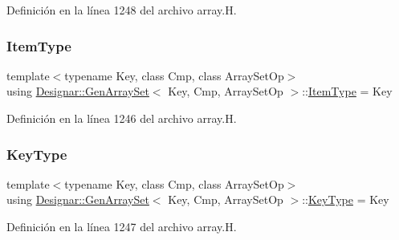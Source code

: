 Definición en la línea 1248 del archivo array.\+H.

\mbox{\label{class_designar_1_1_gen_array_set_a4db3cb71a2b2f88fee2a5f66688e5230}} 
\subsubsection{\texorpdfstring{Item\+Type}{ItemType}}
{\footnotesize\ttfamily template$<$typename Key, class Cmp, class Array\+Set\+Op$>$ \\
using \hyperlink{class_designar_1_1_gen_array_set}{Designar\+::\+Gen\+Array\+Set}$<$ Key, Cmp, Array\+Set\+Op $>$\+::\hyperlink{class_designar_1_1_gen_array_set_a4db3cb71a2b2f88fee2a5f66688e5230}{Item\+Type} =  Key}



Definición en la línea 1246 del archivo array.\+H.

\mbox{\label{class_designar_1_1_gen_array_set_a21195191743cf71430c939225a2c8d60}} 
\subsubsection{\texorpdfstring{Key\+Type}{KeyType}}
{\footnotesize\ttfamily template$<$typename Key, class Cmp, class Array\+Set\+Op$>$ \\
using \hyperlink{class_designar_1_1_gen_array_set}{Designar\+::\+Gen\+Array\+Set}$<$ Key, Cmp, Array\+Set\+Op $>$\+::\hyperlink{class_designar_1_1_gen_array_set_a21195191743cf71430c939225a2c8d60}{Key\+Type} =  Key}



Definición en la línea 1247 del archivo array.\+H.

\mbox{\label{class_designar_1_1_gen_array_set_aabe7047d492721160f291bf40ecf7745}} 
